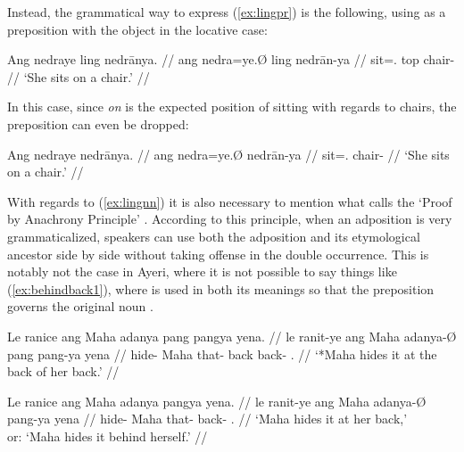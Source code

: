 \xe


\noindent Instead, the grammatical way to express (\ref{ex:lingpr}) is the 
following, using  as a preposition with the object in the 
locative case:

\ex\begingl
	\gla Ang nedraye ling nedrānya. //
	\glb ang nedra=ye.Ø ling nedrān-ya //
	\glc \AgtT{} sit=\TsgF{}.\Top{} top chair-\Loc{} //
	\glft `She sits on a chair.' //
\endgl\xe

In this case, since \emph{on} is the expected position of sitting with regards 
to chairs, the preposition can even be dropped:

\ex\begingl
	\gla Ang nedraye nedrānya. //
	\glb ang nedra=ye.Ø nedrān-ya //
	\glc \AgtT{} sit=\TsgF{}.\Top{} chair-\Loc{} //
	\glft `She sits on a chair.' //
\endgl\xe

With regards to (\ref{ex:lingnn}) it is also necessary to mention what 
\citet{hagege2010} calls the `Proof by Anachrony Principle' 
\citep[158--159]{hagege2010}. According to this principle, when an adposition 
is very grammaticalized, speakers can use both the adposition and its 
etymological ancestor side by side without taking offense in the double 
occurrence. This is notably not the case in Ayeri, where it is not possible to 
say things like (\ref{ex:behindback1}), where  is used in both 
its meanings so that the preposition  governs the 
original noun .

\pex
\a\label{ex:behindback1}\ljudge* \begingl
	\gla Le ranice ang Maha adanya pang pangya yena. //
	\glb le ranit-ye ang Maha adanya-Ø pang pang-ya yena //
	\glc \PatTI{} hide-\TsgF{} \Aarg{} Maha that-\Top{} back back-\Loc{} 
		\TsgF{}.\Gen{} //
	\glft `*Maha hides it at the back of her back.' //
\endgl

\a\label{ex:behindback2}\begingl
	\gla Le ranice ang Maha adanya pangya yena. //
	\glb le ranit-ye ang Maha adanya-Ø pang-ya yena //
	\glc \PatTI{} hide-\TsgF{} \Aarg{} Maha that-\Top{} back-\Loc{} 
		\TsgF{}.\Gen{} //
	\glft `Maha hides it at her back,'\\
		or: `Maha hides it behind herself.' //
\endgl

\xe

